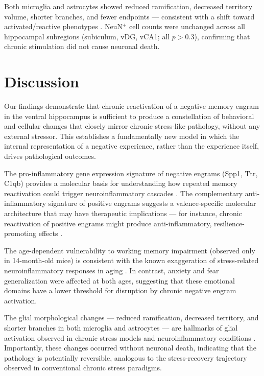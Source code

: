 \documentclass[11pt]{article}
\begin{document}
Both microglia and astrocytes showed reduced ramification, decreased territory volume, shorter branches, and fewer endpoints --- consistent with a shift toward activated/reactive phenotypes \citep{nimmerjahn2005resting, liddelow2017neurotoxic}. NeuN$^+$ cell counts were unchanged across all hippocampal subregions (subiculum, vDG, vCA1; all $p > 0.3$), confirming that chronic stimulation did not cause neuronal death.

\section{Discussion}

Our findings demonstrate that chronic reactivation of a negative memory engram in the ventral hippocampus is sufficient to produce a constellation of behavioral and cellular changes that closely mirror chronic stress-like pathology, without any external stressor. This establishes a fundamentally new model in which the internal representation of a negative experience, rather than the experience itself, drives pathological outcomes.

The pro-inflammatory gene expression signature of negative engrams (Spp1, Ttr, C1qb) provides a molecular basis for understanding how repeated memory reactivation could trigger neuroinflammatory cascades \citep{wohleb2016integrating, dantzer2008cytokines}. The complementary anti-inflammatory signature of positive engrams suggests a valence-specific molecular architecture that may have therapeutic implications --- for instance, chronic reactivation of positive engrams might produce anti-inflammatory, resilience-promoting effects \citep{redondo2014bidirectional}.

The age-dependent vulnerability to working memory impairment (observed only in 14-month-old mice) is consistent with the known exaggeration of stress-related neuroinflammatory responses in aging \citep{miller2010aging, frank2018microglia}. In contrast, anxiety and fear generalization were affected at both ages, suggesting that these emotional domains have a lower threshold for disruption by chronic negative engram activation.

The glial morphological changes --- reduced ramification, decreased territory, and shorter branches in both microglia and astrocytes --- are hallmarks of glial activation observed in chronic stress models and neuroinflammatory conditions \citep{yirmiya2015depression, liddelow2017neurotoxic}. Importantly, these changes occurred without neuronal death, indicating that the pathology is potentially reversible, analogous to the stress-recovery trajectory observed in conventional chronic stress paradigms.
\end{document}
